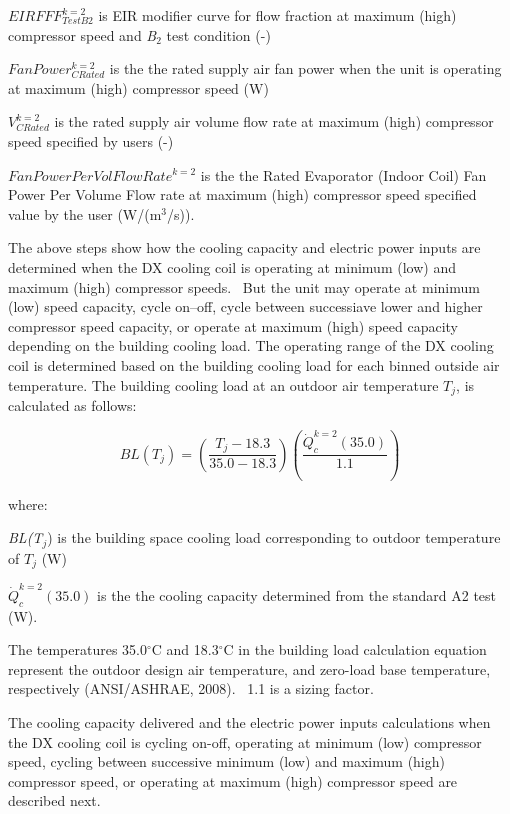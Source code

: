 \(EIRFFF_{TestB2}^{k = 2}\) is EIR modifier curve for flow fraction at maximum (high) compressor speed and \emph{B}\(_{2}\) test condition (-)

\(FanPower_{CRated}^{k = 2}\) is the the rated supply air fan power when the unit is operating at maximum (high) compressor speed (W)

\(V_{CRated}^{k = 2}\) is the rated supply air volume flow rate at maximum (high) compressor speed specified by users (-)

\(FanPowerPerVolFlowRat{e^{k = 2}}\) is the the Rated Evaporator (Indoor Coil) Fan Power Per Volume Flow rate at maximum (high) compressor speed specified value by the user (W/(m\(^3\)/s)).

The above steps show how the cooling capacity and electric power inputs are determined when the DX cooling coil is operating at minimum (low) and maximum (high) compressor speeds.~ But the unit may operate at minimum (low) speed capacity, cycle on--off, cycle between successiave lower and higher compressor speed capacity, or operate at maximum (high) speed capacity depending on the building cooling load. The operating range of the DX cooling coil is determined based on the building cooling load for each binned outside air temperature. The building cooling load at an outdoor air temperature \(T_{j}\), is calculated as follows:

\begin{equation}
BL({T_j}) = \left( {\frac{{{T_j} - 18.3}}{{35.0 - 18.3}}} \right)\left( {\frac{{\dot Q_c^{k = 2}(35.0)}}{{1.1}}} \right)
\end{equation}

where:

\emph{BL(T}\(_{j}\)) is the building space cooling load corresponding to outdoor temperature of \(T_{j}\) (W)

\(\dot Q_c^{k = 2}(35.0)\) is the the cooling capacity determined from the standard A2 test (W).

The temperatures 35.0\(^{\circ}\)C and 18.3\(^{\circ}\)C in the building load calculation equation represent the outdoor design air temperature, and zero-load base temperature, respectively (ANSI/ASHRAE, 2008).~ 1.1 is a sizing factor.

The cooling capacity delivered and the electric power inputs calculations when the DX cooling coil is cycling on-off, operating at minimum (low) compressor speed, cycling between successive minimum (low) and maximum (high) compressor speed, or operating at maximum (high) compressor speed are described next.

